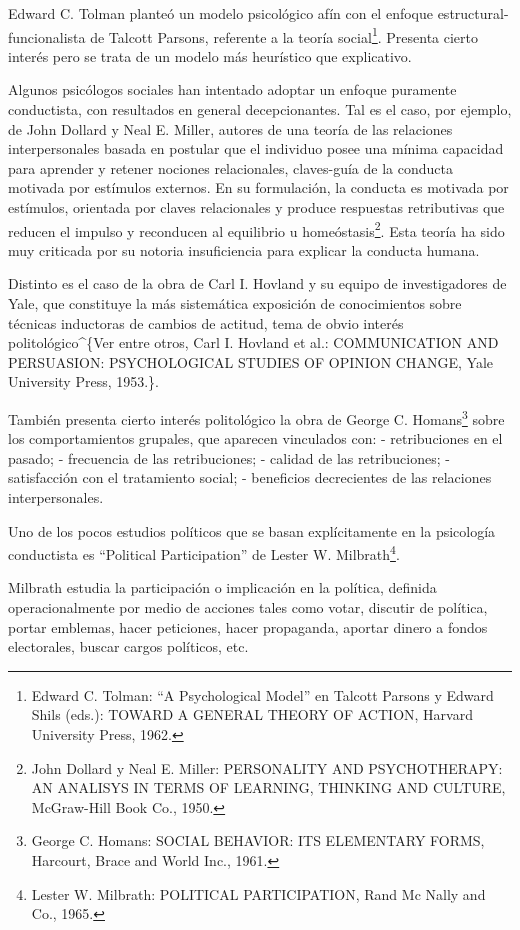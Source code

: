 \documentclass[
]{book}
\begin{document}
Edward C. Tolman planteó un modelo psicológico afín con el enfoque estructural-funcionalista de Talcott Parsons, referente a la teoría social\footnote{Edward C. Tolman: ``A Psychological Model'' en Talcott Parsons y Edward Shils (eds.): TOWARD A GENERAL THEORY OF ACTION, Harvard University Press, 1962.}. Presenta cierto interés pero se trata de un modelo más heurístico que explicativo.

Algunos psicólogos sociales han intentado adoptar un enfoque puramente conductista, con resultados en general decepcionantes. Tal es el caso, por ejemplo, de John Dollard y Neal E. Miller, autores de una teoría de las relaciones interpersonales basada en postular que el individuo posee una mínima capacidad para aprender y retener nociones relacionales, claves-guía de la conducta motivada por estímulos externos. En su formulación, la conducta es motivada por estímulos, orientada por claves relacionales y produce respuestas retributivas que reducen el impulso y reconducen al equilibrio u homeóstasis\footnote{John Dollard y Neal E. Miller: PERSONALITY AND PSYCHOTHERAPY: AN ANALISYS IN TERMS OF LEARNING, THINKING AND CULTURE, McGraw-Hill Book Co., 1950.}. Esta teoría ha sido muy criticada por su notoria insuficiencia para explicar la conducta humana.

Distinto es el caso de la obra de Carl I. Hovland y su equipo de investigadores de Yale, que constituye la más sistemática exposición de conocimientos sobre técnicas inductoras de cambios de actitud, tema de obvio interés politológico\^{}\{Ver entre otros, Carl I. Hovland et al.: COMMUNICATION AND PERSUASION: PSYCHOLOGICAL STUDIES OF OPINION CHANGE, Yale University Press, 1953.\}.

También presenta cierto interés politológico la obra de George C. Homans\footnote{George C. Homans: SOCIAL BEHAVIOR: ITS ELEMENTARY FORMS, Harcourt, Brace and World Inc., 1961.} sobre los comportamientos grupales, que aparecen vinculados con: - retribuciones en el pasado; - frecuencia de las retribuciones; - calidad de las retribuciones; - satisfacción con el tratamiento social; - beneficios decrecientes de las relaciones interpersonales.

Uno de los pocos estudios políticos que se basan explícitamente en la psicología conductista es ``Political Participation'' de Lester W. Milbrath\footnote{Lester W. Milbrath: POLITICAL PARTICIPATION, Rand Mc Nally and Co., 1965.}.

Milbrath estudia la participación o implicación en la política, definida operacionalmente por medio de acciones tales como votar, discutir de política, portar emblemas, hacer peticiones, hacer propaganda, aportar dinero a fondos electorales, buscar cargos políticos, etc.
\end{document}

